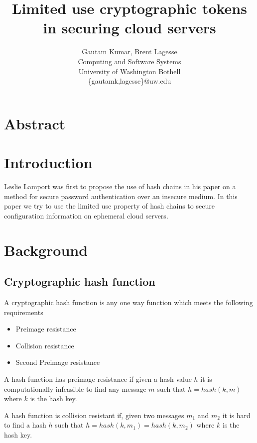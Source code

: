 \documentclass[12pt,conference]{IEEEtran}
\begin{document}
\title{Limited use cryptographic tokens in securing cloud servers}


\author{
{\rm Gautam Kumar, Brent Lagesse}\\
Computing and Software Systems\\
University of Washington Bothell\\
\{gautamk,lagesse\}@uw.edu
} %

\maketitle
\thispagestyle{empty}


\section*{Abstract}
\section*{Introduction}

Leslie Lamport \cite{lamport_password_1981} was first to propose the use of hash chains in his paper on a method for secure password authentication over an insecure medium. In this paper we try to use the limited use property of hash chains to secure configuration information on ephemeral cloud servers.

\section*{Background}
\subsection*{Cryptographic hash function \cite{rogaway_cryptographic_2004}} 
A cryptographic hash function is any one way function which meets the following requirements 
\begin{itemize} 
\item Preimage resistance
\item Collision resistance
\item Second Preimage resistance
\end{itemize}

A hash function has preimage resistance if given a hash value $h$ it is computationally infeasible to find any message $m$ such that $h = hash(k,m)$ where $k$ is the hash key.

A hash function is collision resistant if, given two messages $m_{1}$ and $m_{2}$ it is hard to find a hash $h$ such that $h = hash(k,m_{1}) = hash(k,m_{2})$ where $k$ is the hash key.
\end{document}
